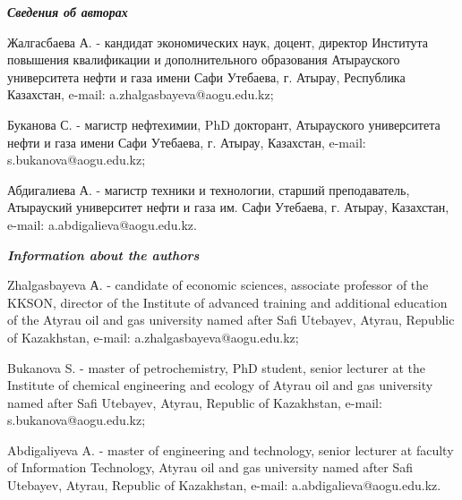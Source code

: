 \begin{authorinfo}
\hspace{1em}\emph{{\bfseries Сведения об авторах}}

Жалгасбаева А. - кандидат экономических наук, доцент, директор Института
повышения квалификации и дополнительного образования Атырауского
университета нефти и газа имени Сафи Утебаева, г. Атырау, Республика
Казахстан, e-mail: a.zhalgasbayeva@aogu.edu.kz; 

Буканова С. - магистр нефтехимии, PhD докторант, Атырауского
университета нефти и газа имени Сафи Утебаева, г. Атырау, Казахстан,
e-mail: s.bukanova@aogu.edu.kz;

Абдигалиева А. - магистр техники и технологии, старший преподаватель,
Атырауский университет нефти и газа им. Сафи Утебаева, г. Атырау,
Казахстан, e-mail: a.abdigalieva@aogu.edu.kz.

\hspace{1em}\emph{{\bfseries Information about the authors}}

Zhalgasbayeva А. - candidate of economic sciences, associate professor
of the KKSON, director of the Institute of advanced training and
additional education of the Atyrau oil and gas university named after
Safi Utebayev, Atyrau, Republic of Kazakhstan,
e-mail: a.zhalgasbayeva@aogu.edu.kz; 

Bukanova S. - master of petrochemistry, PhD student, senior lecturer at
the Institute of chemical engineering and ecology of Atyrau oil and gas
university named after Safi Utebayev, Atyrau, Republic of Kazakhstan,
e-mail: s.bukanova@aogu.edu.kz;

Abdigaliyeva A. - master of engineering and technology, senior lecturer
at faculty of Information Technology, Atyrau oil and gas university
named after Safi Utebayev, Atyrau, Republic of Kazakhstan,
e-mail: a.abdigalieva@aogu.edu.kz.
\end{authorinfo}
